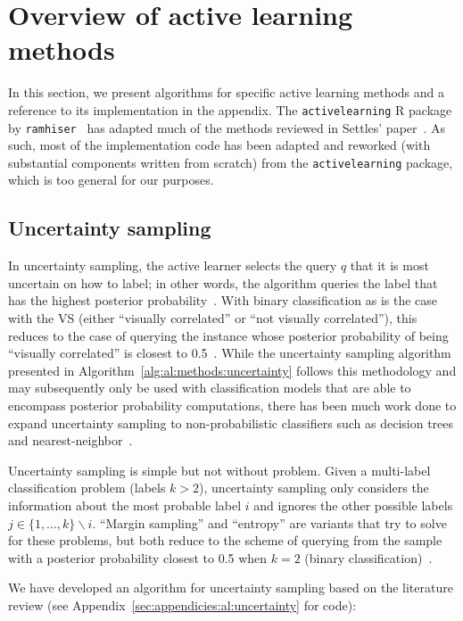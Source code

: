 \section{Overview of active learning methods}
\label{sec:al:methods}

In this section, we present algorithms for specific active learning methods and 
a reference to its implementation in the appendix. The 
\texttt{activelearning} R package by \texttt{ramhiser}~\cite{ramhiser2015} has 
adapted much of the methods reviewed in Settles' paper~\cite{settles2010}. As 
such, most of the implementation code has been adapted and reworked (with 
substantial components written from scratch) from the 
\texttt{activelearning} package, which is too general for our purposes.

\subsection{Uncertainty sampling}
\label{sec:al:methods:uncertainty} 

In uncertainty sampling, the active learner selects the query $q$ that it is 
most uncertain on how to label; in other words, the algorithm queries the label 
that has the highest posterior probability~\cite{lewis1994}. With binary 
classification as is the case with the VS (either ``visually correlated'' or 
``not visually correlated''), this reduces to the case of querying the instance 
whose posterior probability of being ``visually correlated'' is closest to 
0.5~\cite{lewis1994}. While the uncertainty sampling algorithm presented in 
Algorithm~\ref{alg:al:methods:uncertainty} follows this 
methodology and may subsequently only be used with classification models that 
are able to encompass posterior probability computations, there has been much 
work done to expand uncertainty sampling to non-probabilistic classifiers such 
as decision trees and nearest-neighbor~\cite{settles2010}.

Uncertainty sampling is simple but not without problem. Given a multi-label 
classification problem (labels $k > 2$), uncertainty sampling only 
considers the information about the most probable label $i$ and ignores the 
other possible labels $j \in \{1,...,k\}\backslash i$. ``Margin sampling'' and 
``entropy'' are variants that try to solve for these problems, but 
both reduce to the scheme of querying from the sample with a posterior 
probability closest to 0.5 when $k=2$ (binary 
classification)~\cite{settles2010}.

We have developed an algorithm for uncertainty sampling based on the literature 
review (see Appendix~\ref{sec:appendicies:al:uncertainty} for code):

